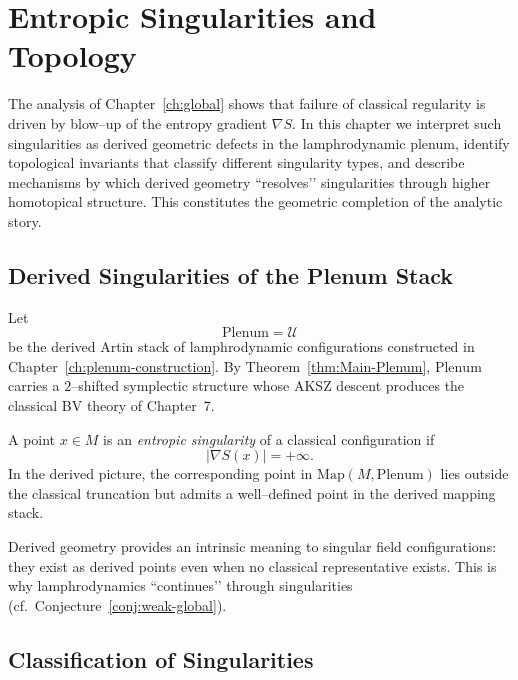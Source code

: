 \chapter{Entropic Singularities and Topology}
\label{ch:entropic-topology}

The analysis of Chapter~\ref{ch:global} shows that failure of classical
regularity is driven by blow--up of the entropy gradient $\nabla S$.
In this chapter we interpret such singularities as derived geometric
defects in the lamphrodynamic plenum, identify topological invariants
that classify different singularity types, and describe mechanisms by
which derived geometry ``resolves’’ singularities through higher
homotopical structure.
This constitutes the geometric completion of the analytic story.



\section{Derived Singularities of the Plenum Stack}
\label{sec:derived-sing}

Let
\[
\mathrm{Plenum}
= \mathcal{U}
\]
be the derived Artin stack of lamphrodynamic configurations constructed
in Chapter~\ref{ch:plenum-construction}.  By
Theorem~\ref{thm:Main-Plenum}, $\mathrm{Plenum}$ carries a
$2$--shifted symplectic structure whose AKSZ descent produces the
classical BV theory of Chapter~7.

\begin{definition}
A point $x\in M$ is an \emph{entropic singularity} of a classical
configuration if
\[
|\nabla S(x)|=+\infty.
\]
In the derived picture, the corresponding point in
$\mathrm{Map}(M,\mathrm{Plenum})$ lies outside the classical truncation
but admits a well--defined point in the derived mapping stack.
\end{definition}

\begin{remark}
Derived geometry provides an intrinsic meaning to singular field
configurations: they exist as derived points even when no classical
representative exists.  This is why lamphrodynamics “continues’’
through singularities (cf.~Conjecture~\ref{conj:weak-global}).
\end{remark}



\section{Classification of Singularities}
\label{sec:classification}

